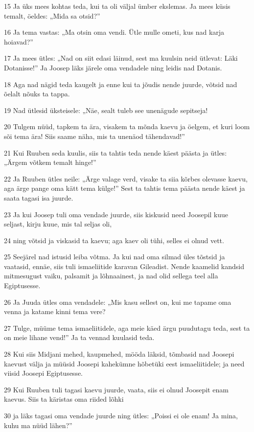 \par 15 Ja üks mees kohtas teda, kui ta oli väljal ümber ekslemas. Ja mees küsis temalt, öeldes: „Mida sa otsid?”
\par 16 Ja tema vastas: „Ma otsin oma vendi. Ütle mulle ometi, kus nad karja hoiavad?”
\par 17 Ja mees ütles: „Nad on siit edasi läinud, sest ma kuulsin neid ütlevat: Läki Dotanisse!” Ja Joosep läks järele oma vendadele ning leidis nad Dotanis.
\par 18 Aga nad nägid teda kaugelt ja enne kui ta jõudis nende juurde, võtsid nad õelalt nõuks ta tappa.
\par 19 Nad ütlesid üksteisele: „Näe, sealt tuleb see unenägude sepitseja!
\par 20 Tulgem nüüd, tapkem ta ära, visakem ta mõnda kaevu ja öelgem, et kuri loom sõi tema ära! Siis saame näha, mis ta unenäod tähendavad!”
\par 21 Kui Ruuben seda kuulis, siis ta tahtis teda nende käest päästa ja ütles: „Ärgem võtkem temalt hinge!”
\par 22 Ja Ruuben ütles neile: „Ärge valage verd, visake ta siia kõrbes olevasse kaevu, aga ärge pange oma kätt tema külge!” Sest ta tahtis tema päästa nende käest ja saata tagasi isa juurde.
\par 23 Ja kui Joosep tuli oma vendade juurde, siis kiskusid need Joosepil kuue seljast, kirju kuue, mis tal seljas oli,
\par 24 ning võtsid ja viskasid ta kaevu; aga kaev oli tühi, selles ei olnud vett.
\par 25 Seejärel nad istusid leiba võtma. Ja kui nad oma silmad üles tõstsid ja vaatasid, ennäe, siis tuli ismaeliitide karavan Gileadist. Nende kaamelid kandsid mitmesugust vaiku, palsamit ja lõhnaainest, ja nad olid sellega teel alla Egiptusesse.
\par 26 Ja Juuda ütles oma vendadele: „Mis kasu sellest on, kui me tapame oma venna ja katame kinni tema vere?
\par 27 Tulge, müüme tema ismaeliitidele, aga meie käed ärgu puudutagu teda, sest ta on meie lihane vend!” Ja ta vennad kuulasid teda.
\par 28 Kui siis Midjani mehed, kaupmehed, mööda läksid, tõmbasid nad Joosepi kaevust välja ja müüsid Joosepi kahekümne hõbetüki eest ismaeliitidele; ja need viisid Joosepi Egiptusesse.
\par 29 Kui Ruuben tuli tagasi kaevu juurde, vaata, siis ei olnud Joosepit enam kaevus. Siis ta käristas oma riided lõhki
\par 30 ja läks tagasi oma vendade juurde ning ütles: „Poissi ei ole enam! Ja mina, kuhu ma nüüd lähen?”
